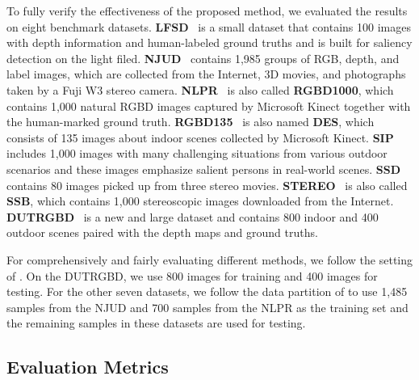 \documentclass[runningheads]{llncs}
\begin{document}
To fully verify the effectiveness of the proposed method, we evaluated the results on eight benchmark datasets.
\textbf{LFSD}~\cite{LFSD} is a small dataset that contains 100 images with depth information and human-labeled ground truths and is built for saliency detection on the light filed.
\textbf{NJUD}~\cite{NLUD} contains 1,985 groups of RGB, depth, and label images, which are collected from the Internet, 3D movies, and photographs taken by a Fuji W3 stereo camera.
\textbf{NLPR}~\cite{NLPR} is also called \textbf{RGBD1000}, which contains 1,000 natural RGBD images captured by Microsoft Kinect together with the human-marked ground truth.
\textbf{RGBD135}~\cite{RGBD135} is also named \textbf{DES}, which consists of 135 images about indoor scenes collected by Microsoft Kinect.
\textbf{SIP}~\cite{SIP} includes 1,000 images with many challenging situations from various outdoor scenarios and these images emphasize salient persons in real-world scenes.
\textbf{SSD}~\cite{SSD} contains 80 images picked up from three
stereo movies.
\textbf{STEREO}~\cite{STEREO} is also called \textbf{SSB}, which contains 1,000 stereoscopic images downloaded from the Internet.
\textbf{DUTRGBD}~\cite{DUTRGBD} is a new and large dataset and contains 800 indoor and 400 outdoor scenes paired with the depth maps and ground truths.

For comprehensively and fairly evaluating different methods, we follow the setting of \cite{DUTRGBD}. On the DUTRGBD, we use 800 images for training and 400 images for testing. For the other seven datasets, we follow the data partition of \cite{PCANet,MMCI,CTMF,DUTRGBD} to use 1,485 samples from the NJUD and 700 samples from the NLPR as the training set and the remaining samples in these datasets are used for testing.

\subsection{Evaluation Metrics}
\end{document}
